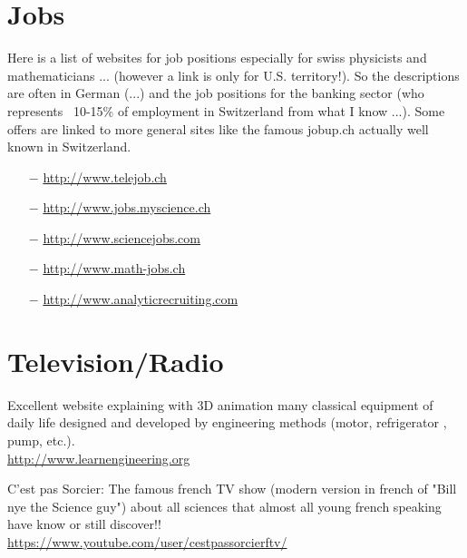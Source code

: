 	\pagebreak
	\section{Jobs}
	
	{\Large {}} Here is a list of websites for job positions especially for swiss physicists and mathematicians ... (however a link is only for U.S. territory!). So the descriptions are often in German (...) and the job positions for the banking sector (who represents ~10-15\% of employment in Switzerland from what I know ...). Some offers are linked to more general sites like the famous jobup.ch actually well known in Switzerland.
	
	\begin{itemize}	 
		\item[$-$] \href{http://www.telejob.ch}{\color{blue}http://www.telejob.ch} 
	
		\item[$-$] \href{http://www.jobs.myscience.ch}{\color{blue}http://www.jobs.myscience.ch} 
	
		\item[$-$] \href{http://www.sciencejobs.com}{\color{blue}http://www.sciencejobs.com}
	
		\item[$-$] \href{http://www.math-jobs.ch}{\color{blue}http://www.math-jobs.ch}
	
		\item[$-$] \href{http://www.analyticrecruiting.com}{\color{blue}http://www.analyticrecruiting.com}
	\end{itemize}
	
	\section{Television/Radio}

	{\Large {}} Excellent website explaining with 3D animation many classical equipment of daily life designed and developed by engineering methods (motor, refrigerator , pump, etc.).\\
	\href{http://www.learnengineering.org}{\color{blue}http://www.learnengineering.org}
	
	\bcdfrance{} C'est pas Sorcier: The famous french TV show (modern version in french of "Bill nye the Science guy") about all sciences that almost all young french speaking have know or still discover!!\\
	\href{https://www.youtube.com/user/cestpassorcierftv/}{\color{blue}https://www.youtube.com/user/cestpassorcierftv/}
	
